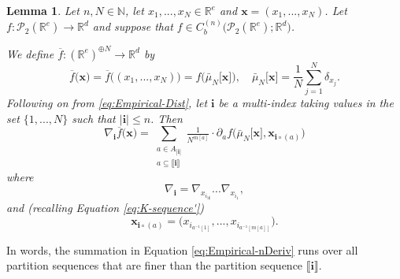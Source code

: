 \documentclass[a4paper,11pt,twoside]{article}
\numberwithin{equation}{section}
\theoremstyle{plain}
\newtheorem{lemma}[theorem]{Lemma}
\newcommand{\bN}{\mathbb{N}}
\newcommand{\bR}{\mathbb{R}}
\newcommand{\cP}{\mathcal{P}}
\newcommand{\1}{\mathbbm{1}}
\begin{document}
	\begin{lemma}
		\label{Empirical-nDeriv}
		Let $n, N\in \bN$, let $x_1, ..., x_N \in \bR^e$ and $\boldsymbol{x} = (x_1, ..., x_N)$. Let $f: \cP_2(\bR^e) \to \bR^d$ and suppose that $f\in C_b^{(n)}\big( \cP_2(\bR^e); \bR^d \big)$. 
		
		
		We define $\overline{f}: (\bR^e)^{\oplus N} \to \bR^d$ by
		\begin{equation}
			\label{eq:Empirical-nDeriv-defn}
			\overline{f}\big( \boldsymbol{x} \big) = \overline{f}\big( (x_1, ..., x_N) \big) = f\Big( \bar{\mu}_N \big[ \boldsymbol{x} \big] \Big), \quad \bar{\mu}_N\big[ \boldsymbol{x} \big] = \frac{1}{N} \sum_{j=1}^N \delta_{x_j}. 
		\end{equation}
		Following on from \eqref{eq:Empirical-Dist}, let $\boldsymbol{i}$ be a multi-index taking values in the set $\{1, ..., N \}$ such that $|\boldsymbol{i}|\leq n$. Then
		\begin{equation}
			\label{eq:Empirical-nDeriv}
			\nabla_{\boldsymbol{i}} \overline{f}\Big( \boldsymbol{x} \Big) = \sum_{\substack{a \in A_{|\boldsymbol{i}|} \\ a \subseteq \llbracket \boldsymbol{i} \rrbracket}} \tfrac{1}{N^{m[a]}} \cdot \partial_a f \Big( \bar{\mu}_N\big[ \boldsymbol{x} \big], \boldsymbol{x}_{\boldsymbol{i}\circ (a)} \Big) 
		\end{equation}
		where 
		\begin{equation*}
			\nabla_{\boldsymbol{i}} = \nabla_{x_{i_{|\boldsymbol{i}|}}} ... \nabla_{x_{i_1}}, 
		\end{equation*}
		and (recalling Equation \eqref{eq:K-sequence'})
		\begin{equation*}
			\boldsymbol{x}_{\boldsymbol{i}\circ (a)} = \big( x_{i_{a^{-1}[1]}}, ..., x_{i_{a^{-1}[m[a]]}} \big). 
		\end{equation*}
	\end{lemma}
	In words, the summation in Equation \eqref{eq:Empirical-nDeriv} runs over all partition sequences that are finer than the partition sequence $\llbracket \boldsymbol{i} \rrbracket$. 
	
\end{document}
